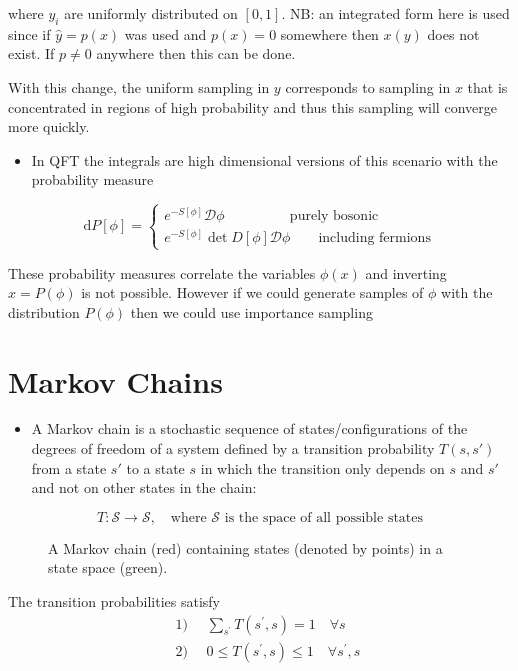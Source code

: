 where \(y_{i}\) are uniformly distributed on \([0,1]\). NB: an integrated form here is used since if $\hat{y} = p(x)$ was used and $p(x) = 0$ somewhere then $x(y)$ does not exist. If $p \neq 0$ anywhere then this can be done.

With this change, the uniform sampling in $y$ corresponds to sampling in $x$ that is concentrated in regions of high probability and thus this sampling will converge more quickly.

\begin{itemize}
    \item In QFT the integrals are high dimensional versions of this scenario with the probability measure
\end{itemize}
\begin{equation}
    \text{d}P[\phi] = \begin{cases}
        e^{-S[\phi]}\mathcal{D}\phi \qquad \qquad \: \: \:\text{purely bosonic}\\
        e^{-S[\phi]}\operatorname{det}D[\phi]\mathcal{D}\phi \qquad \text{including fermions}
    \end{cases}
\end{equation}


These probability measures correlate the variables $\phi(x)$ and inverting $x = P(\phi)$ is not possible. However if we could generate samples of $\phi$ with the distribution $P(\phi)$ then we could use importance sampling

\section{Markov Chains}
\begin{itemize}
    \item A Markov chain is a stochastic sequence of states/configurations of the degrees of freedom of a system defined by a transition probability $T(s,s')$ from a state $s'$ to a state $s$ in which the transition only depends on $s$ and $s'$ and not on other states in the chain:
\end{itemize}
\begin{equation}
    T: \mathcal{S} \rightarrow \mathcal{S}, \quad \text{where }\mathcal{S}\text{ is the space of all possible states}
\end{equation}
\begin{figure}
    \centering
    \caption{A Markov chain (red) containing states (denoted by points) in a state space (green).}
    \label{fig:fig_mc}
\end{figure}
The transition probabilities satisfy
\begin{equation}
\begin{aligned}
& \text { 1) } \quad \sum_{s^{\prime}} T\left(s^{\prime}, s\right)=1 \quad \forall s\\
& \text { 2) } \quad 0 \leqslant T\left(s^{\prime}, s\right) \leqslant 1 \quad \forall s^{\prime}, s
\end{aligned}
\end{equation}

